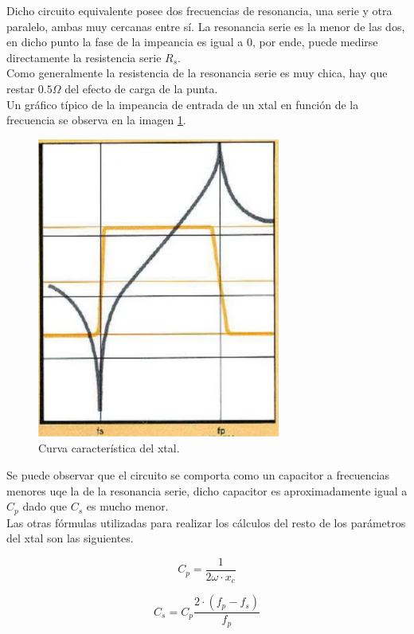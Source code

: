 \documentclass[a4paper,10pt]{article}
\begin{document}
		\indent Dicho circuito equivalente posee dos frecuencias de resonancia,
		una serie y otra paralelo, ambas muy cercanas entre sí. La resonancia 
		serie es la menor de las dos, en dicho punto la fase de la impeancia es
		igual a 0, por ende, puede medirse directamente la resistencia serie 
		$R_s$. \\
		\indent Como generalmente la resistencia de la resonancia serie es muy 
		chica, hay que restar $0.5\Omega$ del efecto de carga de la punta. \\
		\indent Un gráfico típico de la impeancia de entrada de un xtal en 
		función de la frecuencia se observa en la imagen \ref{img005}.
		
		\begin{figure}[!htb]
			\centering
			\includegraphics[width=8cm]{Imagenes/curvaCaractXtal.png}
			\caption{Curva característica del xtal.}
			\label{img005} 
		\end{figure}

		\indent Se puede observar que el circuito se comporta como un capacitor
		a frecuencias menores uqe la de la resonancia serie, dicho capacitor es 
		aproximadamente igual a $C_p$ dado que $C_s$ es mucho menor. \\
		\indent Las otras fórmulas utilizadas para realizar los cálculos del 
		resto de los parámetros del xtal son las siguientes.
	
		\begin{equation} \label{eq001}
			C_p = \frac{1}{2\omega\cdot x_c}		
		\end{equation}
		
		\begin{equation} \label{eq002}
			C_s = C_p \frac{2\cdot(f_p - f_s)}{f_p}
		\end{equation}
\end{document}
